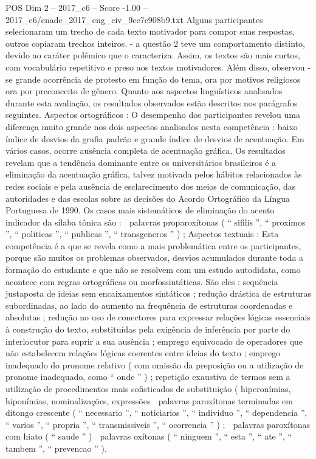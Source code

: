 \begin{textsample}{POS Dim 2 – 2017\_c6 – Score -1.00 – 2017\_c6/enade\_2017\_eng\_civ\_9cc7e908b9.txt}
Alguns participantes selecionaram um trecho de cada texto motivador para compor suas respostas, outros copiaram trechos inteiros. - a questão 2 teve um comportamento distinto, devido ao caráter polêmico que o caracteriza.
Assim, os textos são mais curtos, com vocabulário repetitivo e preso aos textos motivadores.
Além disso, observou -se grande ocorrência de protesto em função do tema, ora por motivos religiosos ora por preconceito de gênero.
Quanto aos aspectos linguísticos analisados durante esta avaliação, os resultados observados estão descritos nos parágrafos seguintes.
Aspectos ortográficos : O desempenho dos participantes revelou uma diferença muito grande nos dois aspectos analisados nesta competência : baixo índice de desvios da grafia padrão e grande índice de desvios de acentuação.
Em vários casos, ocorre ausência completa de acentuação gráfica.
Os resultados revelam que a tendência dominante entre os universitários brasileiros é a eliminação da acentuação gráfica, talvez motivada pelos hábitos relacionados às redes sociais e pela ausência de esclarecimento dos meios de comunicação, das autoridades e das escolas sobre as decisões do Acordo Ortográfico da Língua Portuguesa de 1990.
Os casos mais sistemáticos de eliminação do acento indicador da sílaba tônica são :  palavras proparoxítonas ( “ sifilis ”, “ proximos ”, “ politicas ”, “ publicas ”, “ transgeneros ” ) ; Aspectos textuais : Esta competência é a que se revela como a mais problemática entre os participantes, porque são muitos os problemas observados, desvios acumulados durante toda a formação do estudante e que não se resolvem com um estudo autodidata, como acontece com regras ortográficas ou morfossintáticas.
São eles : sequência justaposta de ideias sem encaixamentos sintáticos ; redução drástica de estruturas subordinadas, ao lado do aumento na frequência de estruturas coordenadas e absolutas ; redução no uso de conectores para expressar relações lógicas essenciais à construção do texto, substituídas pela exigência de inferência por parte do interlocutor para suprir a sua ausência ; emprego equivocado de operadores que não estabelecem relações lógicas coerentes entre ideias do texto ; emprego inadequado do pronome relativo ( com omissão da preposição ou a utilização de pronome inadequado, como “ onde ” ) ; repetição exaustiva de termos sem a utilização de procedimentos mais sofisticados de substituição ( hiperonímias, hiponímias, nominalizações, expressões  palavras paroxítonas terminadas em ditongo crescente ( “ necessario ”, “ noticiarios ”, “ individuo ”, “ dependencia ”, “ varios ”, “ propria ”, “ transmissiveis ”, “ ocorrencia ” ) ;  palavras paroxítonas com hiato ( “ saude ” )  palavras oxítonas ( “ ninguem ”, “ esta ”, “ ate ”, “ tambem ”, “ prevencao ” ).

\end{textsample}
